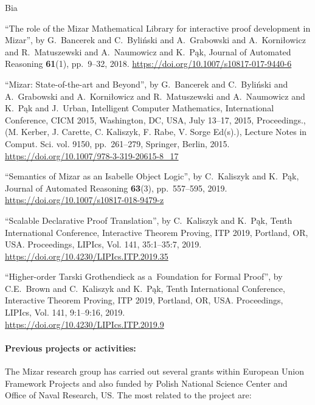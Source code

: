 \begin{sitedescription}{Bia}
\begin{compactitem}

\item ``The role of the {M}izar {M}athematical {L}ibrary for interactive proof development in {M}izar'',
by G.~Bancerek and C.~Byliński and A.~Grabowski and A.~Korniłowicz and R.~Matuszewski and A.~Naumowicz and K.~Pąk,
Journal of Automated Reasoning \textbf{61}(1), pp.~9--32, 2018.
\url{https://doi.org/10.1007/s10817-017-9440-6}

\item ``Mizar: State-of-the-art and Beyond'',
by G.~Bancerek and C.~Byliński and A.~Grabowski and A.~Korniłowicz and R.~Matuszewski and A.~Naumowicz and K.~Pąk and J.~Urban,
Intelligent Computer Mathematics, International Conference, CICM 2015, Washington, DC, USA, 
July 13--17, 2015, Proceedings., (M. Kerber, J. Carette, C. Kaliszyk, F. Rabe, V. Sorge Ed(s).), 
Lecture Notes in Comput. Sci. vol. 9150, pp.~261--279, Springer, Berlin, 2015.
\url{https://doi.org/10.1007/978-3-319-20615-8_17}

\item ``Semantics of Mizar as an Isabelle Object Logic'',
by C.~Kaliszyk and K.~Pąk,
Journal of Automated Reasoning \textbf{63}(3), pp.~557--595, 2019.
\url{https://doi.org/10.1007/s10817-018-9479-z}

\item ``Scalable Declarative Proof Translation'',
by C.~Kaliszyk and K.~Pąk,
Tenth International Conference, Interactive Theorem Proving, ITP 2019, Portland, OR, USA. 
Proceedings,  LIPIcs, Vol. 141, 35:1--35:7, 2019.
\\\url{https://doi.org/10.4230/LIPIcs.ITP.2019.35}

\item ``Higher-order Tarski Grothendieck as a~Foundation for Formal Proof'',
by C.E.~Brown and C.~Kaliszyk and K.~Pąk,
Tenth International Conference, Interactive Theorem Proving, ITP 2019, Portland, OR, USA. 
Proceedings,  LIPIcs, Vol. 141, 9:1--9:16, 2019.
\\\url{https://doi.org/10.4230/LIPIcs.ITP.2019.9}

\end{compactitem}

\paragraph*{Previous projects or activities:}

The Mizar research group has carried out several grants within European Union Framework Projects 
and also funded by Polish National Science Center and Office of Naval Research, US.
The most related to the project are:


\end{sitedescription}
